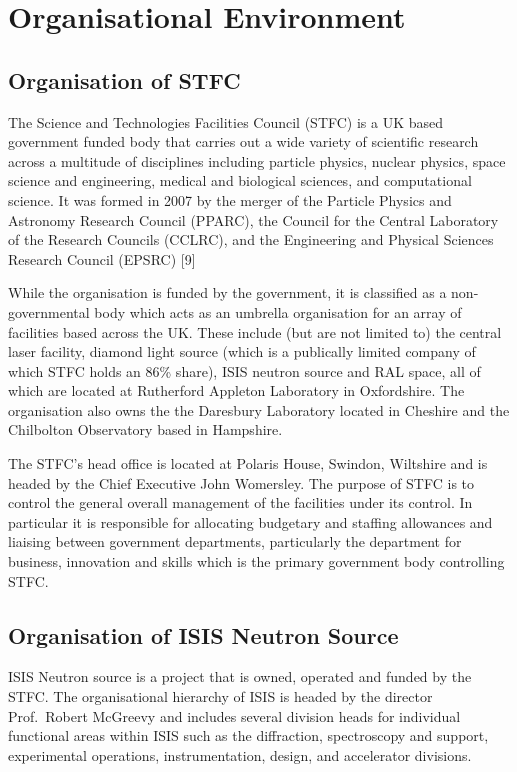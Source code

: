 \documentclass[paper=a4, fontsize=11pt]{scrartcl}	%
\numberwithin{equation}{section}															%
\numberwithin{figure}{section}																%
\numberwithin{table}{section}
\begin{document}
\section{Organisational Environment}\label{organisational-environment}

\subsection{Organisation of STFC}\label{organisation-of-stfc}

The Science and Technologies Facilities Council (STFC) is a UK based
government funded body that carries out a wide variety of scientific
research across a multitude of disciplines including particle physics,
nuclear physics, space science and engineering, medical and biological
sciences, and computational science. It was formed in 2007 by the merger
of the Particle Physics and Astronomy Research Council (PPARC), the
Council for the Central Laboratory of the Research Councils (CCLRC), and
the Engineering and Physical Sciences Research Council (EPSRC) {[}9{]}

While the organisation is funded by the government, it is classified as
a non-governmental body which acts as an umbrella organisation for an
array of facilities based across the UK. These include (but are not
limited to) the central laser facility, diamond light source (which is a
publically limited company of which STFC holds an 86\% share), ISIS
neutron source and RAL space, all of which are located at Rutherford
Appleton Laboratory in Oxfordshire. The organisation also owns the the
Daresbury Laboratory located in Cheshire and the Chilbolton Observatory
based in Hampshire.

The STFC's head office is located at Polaris House, Swindon, Wiltshire
and is headed by the Chief Executive John Womersley. The purpose of STFC
is to control the general overall management of the facilities under its
control. In particular it is responsible for allocating budgetary and
staffing allowances and liaising between government departments,
particularly the department for business, innovation and skills which is
the primary government body controlling STFC.

\subsection{Organisation of ISIS Neutron
Source}\label{organisation-of-isis-neutron-source}

ISIS Neutron source is a project that is owned, operated and funded by
the STFC. The organisational hierarchy of ISIS is headed by the director
Prof.~Robert McGreevy and includes several division heads for individual
functional areas within ISIS such as the diffraction, spectroscopy and
support, experimental operations, instrumentation, design, and
accelerator divisions.
\end{document}
